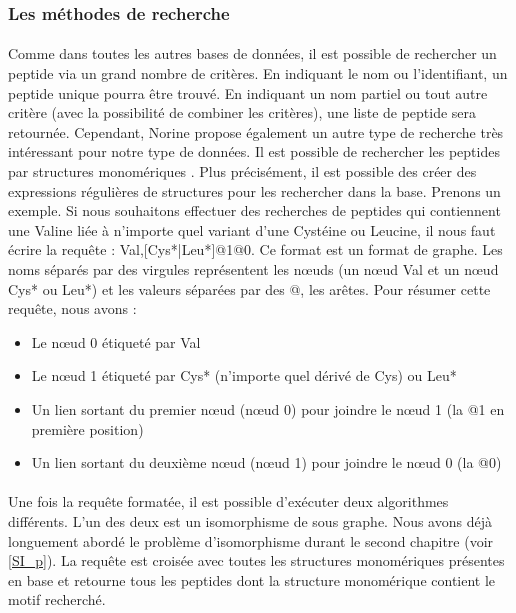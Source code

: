 \documentclass[12pt,french,twoside]{report}
\begin{document}
\subsubsection{Les méthodes de recherche}

\paragraph{}Comme dans toutes les autres bases de données, il est possible de rechercher un peptide via un grand nombre de critères.
En indiquant le nom ou l'identifiant, un peptide unique pourra être trouvé.
En indiquant un nom partiel ou tout autre critère (avec la possibilité de combiner les critères), une liste de peptide sera retournée.
Cependant, Norine propose également un autre type de recherche très intéressant pour notre type de données.
Il est possible de rechercher les peptides par structures monomériques \cite{caboche_structural_2009}.
Plus précisément, il est possible des créer des expressions régulières de structures pour les rechercher dans la base.
Prenons un exemple.
Si nous souhaitons effectuer des recherches de peptides qui contiennent une Valine liée à n'importe quel variant d'une Cystéine ou Leucine, il nous faut écrire la requête : Val,[Cys*|Leu*]@1@0.
Ce format est un format de graphe.
Les noms séparés par des virgules représentent les n\oe{}uds (un n\oe{}ud Val et un n\oe{}ud Cys* ou Leu*) et les valeurs séparées par des @, les arêtes.
Pour résumer cette requête, nous avons :
\begin{itemize}
 \item Le n\oe{}ud 0 étiqueté par Val
 \item Le n\oe{}ud 1 étiqueté par Cys* (n'importe quel dérivé de Cys) ou Leu*
 \item Un lien sortant du premier n\oe{}ud (n\oe{}ud 0) pour joindre le n\oe{}ud 1 (la @1 en première position)
 \item Un lien sortant du deuxième n\oe{}ud (n\oe{}ud 1) pour joindre le n\oe{}ud 0 (la @0)
\end{itemize}

\paragraph{}Une fois la requête formatée, il est possible d'exécuter deux algorithmes différents.
L'un des deux est un isomorphisme de sous graphe.
Nous avons déjà longuement abordé le problème d'isomorphisme durant le second chapitre (voir \ref{SI_p}).
La requête est croisée avec toutes les structures monomériques présentes en base et retourne tous les peptides dont la structure monomérique contient le motif recherché.
\end{document}
